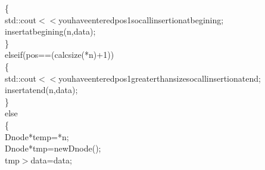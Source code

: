 \documentclass[a4paper, 9pt]{article}
\newcommand\SPC{\hspace*{0.6em}}
\newcommand\TAB{\hspace*{1.2em}}
\newcommand\HYP{\mbox{\char 45}}
\newcommand\QOT{\mbox{\char 34}}
\newcommand{\CppAIdentifier}[1]{\textcolor[rgb]{0.88,0.89,0.89}{#1}}
\newcommand{\CppANumber}[1]{\textcolor[rgb]{1,0.8,0.13}{#1}}
\newcommand{\CppAReservedWord}[1]{\textcolor[rgb]{0.4,0.55,0.69}{#1}}
\newcommand{\CppASpace}[1]{\colorbox[rgb]{0.16,0.19,0.2}{#1}}
\newcommand{\CppAString}[1]{\textcolor[rgb]{0.93,0.46,0}{#1}}
\newcommand{\CppASymbol}[1]{\textcolor[rgb]{0.91,0.89,0.72}{#1}}
\begin{document}
\begin{ttfamily}
\CppASpace{\TAB \TAB \TAB \TAB }\CppASymbol{\{}\\
\CppASpace{\TAB \TAB \TAB \TAB \TAB }\CppAIdentifier{std}\CppASymbol{::}\CppAIdentifier{cout}\CppASymbol{$<$$<$}\CppAString{\QOT you\SPC have\SPC entered\SPC pos\SPC 1\SPC so\SPC call\SPC insertion\SPC at\SPC begining\QOT }\CppASymbol{;}\\
\CppASpace{\TAB \TAB \TAB \TAB \TAB }\CppAIdentifier{insertatbegining}\CppASymbol{(}\CppAIdentifier{n}\CppASymbol{,}\CppAIdentifier{data}\CppASymbol{)}\CppASymbol{;}\\
\CppASpace{\TAB \TAB \TAB }\CppASymbol{\}}\\
\CppASpace{\TAB \TAB \SPC \TAB }\CppAReservedWord{else}\CppASpace{\SPC }\CppAReservedWord{if}\CppASymbol{(}\CppAIdentifier{pos}\CppASymbol{==}\CppASymbol{(}\CppAIdentifier{calcsize}\CppASymbol{(}\CppASymbol{*}\CppAIdentifier{n}\CppASymbol{)}\CppASymbol{+}\CppANumber{1}\CppASymbol{)}\CppASymbol{)}\\
\CppASpace{\TAB \TAB \TAB \TAB }\CppASymbol{\{}\\
\CppASpace{\TAB \TAB \TAB \TAB \SPC \SPC \SPC \SPC }\CppAIdentifier{std}\CppASymbol{::}\CppAIdentifier{cout}\CppASymbol{$<$$<$}\CppAString{\QOT you\SPC have\SPC entered\SPC pos\SPC 1\SPC greater\SPC than\SPC size\SPC so\SPC call\SPC insertion\SPC at\SPC end\QOT }\CppASymbol{;}\\
\CppASpace{\TAB \TAB \TAB \TAB \TAB }\CppAIdentifier{insertatend}\CppASymbol{(}\CppAIdentifier{n}\CppASymbol{,}\CppAIdentifier{data}\CppASymbol{)}\CppASymbol{;}\\
\CppASpace{\TAB \TAB \TAB \TAB }\CppASymbol{\}}\\
\CppASpace{\TAB \TAB \TAB }\CppAReservedWord{else}\\
\CppASpace{\TAB \TAB \TAB }\CppASymbol{\{}\\
\CppASpace{\TAB \TAB \TAB \TAB }\CppAIdentifier{Dnode}\CppASpace{\SPC }\CppASymbol{*}\CppAIdentifier{temp}\CppASpace{\SPC }\CppASymbol{=}\CppASpace{\SPC }\CppASymbol{*}\CppAIdentifier{n}\CppASymbol{;}\\
\CppASpace{\TAB \TAB \TAB \TAB }\CppAIdentifier{Dnode}\CppASymbol{*}\CppASpace{\SPC }\CppAIdentifier{tmp}\CppASpace{\SPC }\CppASymbol{=}\CppASpace{\SPC }\CppAReservedWord{new}\CppASpace{\SPC }\CppAIdentifier{Dnode}\CppASymbol{(}\CppASymbol{)}\CppASymbol{;}\\
\CppASpace{\TAB \TAB \TAB \TAB }\CppAIdentifier{tmp}\CppASymbol{\HYP $>$}\CppAIdentifier{data}\CppASpace{\SPC }\CppASymbol{=}\CppASpace{\SPC }\CppAIdentifier{data}\CppASymbol{;}\\

\end{ttfamily}
\end{document}
